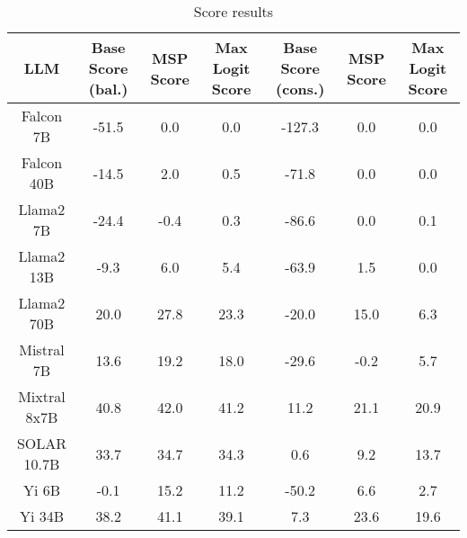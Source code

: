 \renewcommand\arraystretch{1.2}
\begin{table*}
\centering
\begin{tabular}{c|c|c|c|c|c|c}
LLM & Base Score (bal.) & MSP Score & Max Logit Score & Base Score (cons.) & MSP Score & Max Logit Score\\ \hline
Falcon 7B & -51.5 & 0.0 & 0.0 & -127.3 & 0.0 & 0.0\\
Falcon 40B & -14.5 & 2.0 & 0.5 & -71.8 & 0.0 & 0.0\\
Llama2 7B & -24.4 & -0.4 & 0.3 & -86.6 & 0.0 & 0.1\\
Llama2 13B & -9.3 & 6.0 & 5.4 & -63.9 & 1.5 & 0.0\\
Llama2 70B & 20.0 & 27.8 & 23.3 & -20.0 & 15.0 & 6.3\\
Mistral 7B & 13.6 & 19.2 & 18.0 & -29.6 & -0.2 & 5.7\\
Mixtral 8x7B & 40.8 & 42.0 & 41.2 & 11.2 & 21.1 & 20.9\\
SOLAR 10.7B & 33.7 & 34.7 & 34.3 & 0.6 & 9.2 & 13.7\\
Yi 6B & -0.1 & 15.2 & 11.2 & -50.2 & 6.6 & 2.7\\
Yi 34B & 38.2 & 41.1 & 39.1 & 7.3 & 23.6 & 19.6\\
\hline
\end{tabular}
\caption{Score results}
\end{table*}
\label{tab:score}
